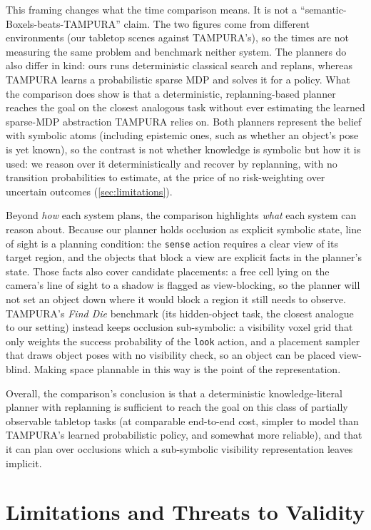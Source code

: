 This framing changes what the time comparison means. It is
not a ``semantic-Boxels-beats-TAMPURA'' claim. The two figures come from
different environments (our tabletop scenes against TAMPURA's), so the
times are not measuring the same problem and benchmark neither
system. The planners do also differ in kind: ours runs deterministic
classical search and replans, whereas TAMPURA learns a probabilistic
sparse MDP and solves it for a policy. What the comparison does show is
that a deterministic, replanning-based planner reaches the goal on the
closest analogous task without ever estimating the learned sparse-MDP
abstraction TAMPURA relies on. Both planners represent the belief with
symbolic atoms (including epistemic ones, such as whether an object's
pose is yet known), so the contrast is not whether knowledge is symbolic
but how it is used: we reason over it deterministically and recover by
replanning, with no transition probabilities to estimate, at the price of
no risk-weighting over uncertain outcomes (\cref{sec:limitations}).

Beyond \emph{how} each system plans, the comparison highlights \emph{what} each system can reason about. Because our planner holds occlusion as explicit symbolic state, line of sight is a planning condition: the \texttt{sense} action requires a clear view of its target region, and the objects that block a view are explicit facts in the planner's state. Those facts also cover candidate placements: a free cell lying on the camera's line of sight to a shadow is flagged as view-blocking, so the planner will not set an object down where it would block a region it still needs to observe. TAMPURA's \emph{Find Die} benchmark (its hidden-object task, the closest analogue to our setting) instead keeps occlusion sub-symbolic: a visibility voxel grid that only weights the success probability of the \texttt{look} action, and a placement sampler that draws object poses with no visibility check, so an object can be placed view-blind. Making space plannable in this way is the point of the representation.

Overall, the comparison's conclusion is that a deterministic knowledge-literal planner with replanning is sufficient to reach the goal on this class of partially observable tabletop tasks (at comparable end-to-end cost, simpler to model than TAMPURA's learned probabilistic policy, and somewhat more reliable), and that it can plan over occlusions which a sub-symbolic visibility representation leaves implicit.

\section{Limitations and Threats to Validity}
\label{sec:disc-validity}
\label{sec:limitations}

